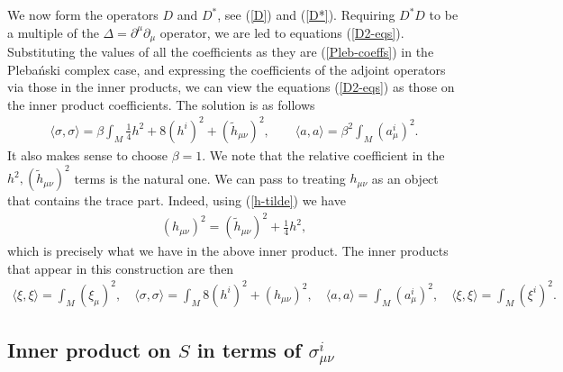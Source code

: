 \documentclass[10pt]{report}
\newcommand{\pleb}[0]{Pleba\'nski}
\theoremstyle{definition}
\begin{document}
 We now form the operators $D$ and $D^*$, see (\ref{D}) and (\ref{D*}). Requiring $D^*D$ to be a multiple of the $\Delta=\partial^\mu\partial_\mu$ operator, we are led to equations (\ref{D2-eqs}). Substituting the values of all the coefficients as they are (\ref{Pleb-coeffs}) in the \pleb{} complex case, and expressing the coefficients of the adjoint operators via those in the inner products, we can view the equations  (\ref{D2-eqs}) as those on the inner product coefficients. The solution is as follows
 \begin{align}
\langle \sigma,\sigma \rangle = \beta \int_M \frac{1}{4} h^2 + 8 (h^i)^2 +  (\tilde{h}_{\mu\nu})^2, \qquad
\langle a,a\rangle = \beta^2 \int_M  (a_\mu^i)^2 .
\end{align}
It also makes sense to choose $\beta=1$. We note that the relative coefficient in the $h^2, (\tilde{h}_{\mu\nu})^2$ terms is the natural one. We can pass to treating $h_{\mu\nu}$ as an object that contains the trace part. Indeed, using (\ref{h-tilde}) we have
\begin{align}\label{trace-tracefree}
(h_{\mu\nu})^2 = (\tilde{h}_{\mu\nu})^2 + \frac{1}{4} h^2, 
\end{align}
which is precisely what we have in the above inner product. The inner products that appear in this construction are then
\begin{align}\label{inner-prod-1}
\langle \xi,\xi \rangle =\int_M (\xi_\mu)^2, \quad
\langle \sigma,\sigma \rangle = \int_M 8 (h^i)^2 +  (h_{\mu\nu})^2, \quad
\langle a,a\rangle =  \int_M  (a_\mu^i)^2 , \quad
\langle \xi,\xi\rangle =  \int_M  (\xi^i)^2.
\end{align}

\subsection{Inner product on \texorpdfstring{$S$ in terms of $\sigma^i_{\mu\nu}$}{}} 
\end{document}

